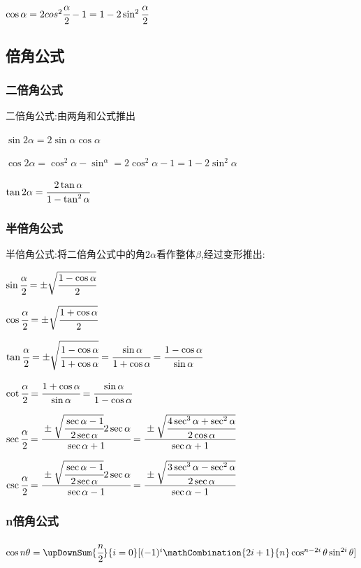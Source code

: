 {{{    $\cos\alpha = 2cos^2\cfrac{\alpha}{2} - 1 = 1-2\sin^2\cfrac{\alpha}{2}$
  }%

}%

\subsection{倍角公式}{

  \subsubsection{二倍角公式}{
    二倍角公式:由两角和公式推出

    $\sin2\alpha = 2\sin\alpha\cos\alpha$

    $\cos2\alpha = \cos^2\alpha - \sin^\alpha = 2\cos^2\alpha - 1 = 1 - 2\sin^2\alpha$

    $\tan2\alpha = \cfrac{2\tan\alpha}{1 - \tan^2\alpha}$
  }%

  \subsubsection{半倍角公式}{
    半倍角公式:将二倍角公式中的角$2\alpha$看作整体$\beta$,经过变形推出:

    $\sin\cfrac{\alpha}{2} = \pm\sqrt{\cfrac{1 - \cos\alpha}{2}}$

    $\cos\cfrac{\alpha}{2} = \pm\sqrt{\cfrac{1 + \cos\alpha}{2}}$

    $\tan\cfrac{\alpha}{2} = \pm\sqrt{\cfrac{1-\cos\alpha}{1+\cos\alpha}} = \cfrac{\sin\alpha}{1+\cos\alpha} = \cfrac{1-\cos\alpha}{\sin\alpha}$

    $\cot\cfrac{\alpha}{2} = \cfrac{1+\cos\alpha}{\sin\alpha} = \cfrac{\sin\alpha}{1-\cos\alpha}$

    $\sec\cfrac{\alpha}{2} = \cfrac{\pm\sqrt{\cfrac{\sec\alpha - 1}{2\sec\alpha}}2\sec\alpha}{\sec\alpha + 1} = \cfrac{\pm\sqrt{\cfrac{4\sec^3\alpha + \sec^2\alpha}{2\cos\alpha}}}{\sec\alpha + 1}$

    $\csc\cfrac{\alpha}{2} = \cfrac{\pm\sqrt{\cfrac{\sec\alpha - 1}{2\sec\alpha}}2\sec\alpha}{\sec\alpha - 1} = \cfrac{\pm\sqrt{\cfrac{3\sec^3\alpha - \sec^2\alpha}{2\sec\alpha}}}{\sec\alpha - 1}$
  }%

  \subsubsection{n倍角公式}{
    $\cos{n\theta} = \upDownSum{\cfrac{n}{2}}{i = 0}[(-1)^i\mathCombination{2i + 1}{n}\cos^{n - 2i}\theta\sin^{2i}\theta]$

}}}
